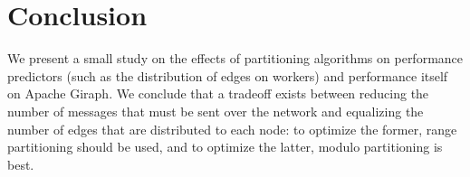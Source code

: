 \section{Conclusion}
\label{sec:conclusion}

We present a small study on the effects of partitioning algorithms on 
performance predictors (such as the distribution of edges on workers) and 
performance itself on Apache Giraph. We conclude that a tradeoff exists between 
reducing the number of messages that must be sent over the network and 
equalizing the number of edges that are distributed to each node: to optimize 
the former, range partitioning should be used, and to optimize the latter, 
modulo partitioning is best. 